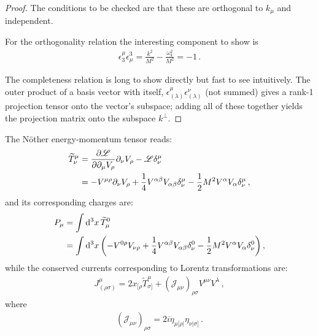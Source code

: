 \documentclass[main.tex]{subfiles}
\begin{document}
\begin{proof}
The conditions to be checked are that these are orthogonal to \(k_\mu \) and independent. 

For the orthogonality relation the interesting component to show is 
%
\begin{align}
\epsilon^{\mu }_{3} \epsilon^{3}_{\mu } = \frac{k^2}{M^2} - \frac{\omega_{k}^2}{M^2} = -1
\,.
\end{align}

The completeness relation is long to show directly but fast to see intuitively. The outer product of a basis vector with itself, \(\epsilon^{\mu }_{(\lambda )} \epsilon^{\nu }_{(\lambda )}\) (not summed) gives a rank-1 projection tensor onto the vector's subspace; adding all of these together yields the projection matrix onto the subspace \(k^{\perp}\). 
\end{proof}

The Nöther energy-momentum tensor reads: 
%
\begin{subequations}
\begin{align}
\widetilde{T}^{\mu }_{\nu } &= \pdv{\mathscr{L}}{\partial_{\mu } V_{\rho }} \partial_{\nu } V_{\rho } - \mathscr{L} \delta^{\mu }_{\nu }  \\
&= - V^{\mu \rho } \partial_{\nu } V_{\rho } + \frac{1}{4} V^{\alpha \beta } V_{\alpha \beta } \delta^{\mu }_{\nu } - \frac{1}{2} M^2 V^{\alpha} V_{\alpha } \delta^{\mu }_{\nu }
\,,
\end{align}
\end{subequations}
%
and its corresponding charges are:
%
\begin{subequations}
\begin{align}
P_{\mu } &= \int \dd[3]{x} \widetilde{T}^{0}_{\mu }  \\
&= \int \dd[3]{x} \qty(- V^{0 \rho } V_{\nu \rho } + \frac{1}{4} V^{\alpha \beta } V_{\alpha \beta } \delta^{0}_{\nu } - \frac{1}{2} M^2V^{\alpha }V_{\alpha } \delta^{0}_{\nu }) 
\,,
\end{align}
\end{subequations}
%
while the conserved currents corresponding to Lorentz transformations are: 
%
\begin{align}
J^{\mu }_{(\rho \sigma )} = 
2 x_{[\rho } \widetilde{T}^{\mu }_{\sigma ]}
+ (\mathscr{J}_{\mu \nu })_{\rho \sigma } V^{\mu \nu } V^{\lambda }
\,,
\end{align}
%
where 
%
\begin{align}
(\mathscr{J}_{\mu \nu })_{\rho \sigma } = 2 i \eta_{\mu [\rho |} \eta_{\nu |\sigma ]}
\,.
\end{align}
\end{document}
